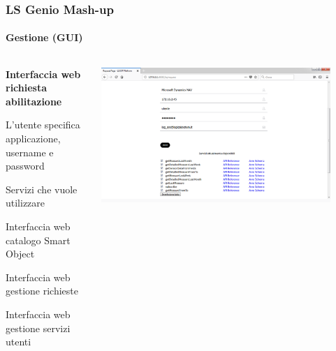 \documentclass{beamer}
\begin{document}
\begin{frame}
	\frametitle{LS Genio Mash-up}
	\framesubtitle{Gestione (GUI)}
	\begin{columns}[T] %
		\begin{column}{.3\textwidth}
			
				\begin{itemize}
					{\tiny
				\item \textbf{Interfaccia web richiesta abilitazione}
				
				\begin{itemize}
					{\tiny
					\item L'utente specifica applicazione, username e password
					\item Servizi che vuole utilizzare
				}
				\end{itemize}
				
				\item Interfaccia web catalogo Smart Object
				\item Interfaccia web gestione richieste
				\item Interfaccia web gestione servizi utenti
			}
			\end{itemize}
		
		\end{column}%
		\hfill%
		\begin{column}{.66\textwidth}
			\includegraphics[width=0.9\textwidth]{images/RequestPagePlatform.png}
		\end{column}%
	\end{columns}
\end{frame}
\end{document}
